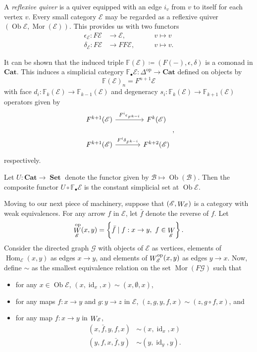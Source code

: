 \documentclass[10pt,letterpaper,cm]{nupset}
\theoremstyle{definition}
\theoremstyle{theorem}
\theoremstyle{remark}
\DeclareMathOperator{\ob}{Ob}
\DeclareMathOperator{\mor}{Mor}
\newcommand{\0}{\mathbf{0}}
\newcommand{\1}{\mathbf{1}}
\newcommand{\2}{\mathbf{2}}
\DeclareMathOperator{\op}{op}
\DeclareMathOperator{\set}{\mathbf{Set}}
\newcommand{\e}{\mathscr{E}}
\DeclareMathOperator{\Hom}{Hom}
\DeclareMathOperator{\idd}{id}
\DeclareMathOperator{\we}{\mathnormal{W}}
\newcommand{\bi}{\begin{itemize}}
\newcommand{\ei}{\end{itemize}}
\begin{document}
\smallskip

A \textit{reflexive quiver} is a quiver equipped with an edge $i_v$ from $v$ to itself for each vertex $v$. Every small category $\e$ may be regarded as a reflexive quiver $\left(\ob{\e}, \mor(\e)\right)$. This provides us with two functors
\begin{alignat*}
\epsilon_{\e} : F{\e} &\longrightarrow \e , &&\  \quad v \mapsto v
\\ \delta_{\e}: F{\e} &\longrightarrow F{F{\e}}, &&\  \quad v \mapsto v.
\end{alignat*} 

It can be shown that the induced  triple $\mathbb{F}(\e)\coloneqq \left(F({-}), \epsilon, \delta\right)$ is a comonad in $\mathbf{Cat}$. This induces a simplicial category $\mathbb{F}_{\bullet}{\e} : \varDelta^{\op} \to \mathbf{Cat}$ defined on objects by
\[
\mathbb{F}(\e)_n = F^{n+1}{\e}
\]
with face $d_i : \mathbb{F}_k(\e) \to  \mathbb{F}_{k-1}(\e)$ and degeneracy $s_i :  \mathbb{F}_k(\e) \to  \mathbb{F}_{k+1}(\e)$ operators given by
\[
\begin{tikzcd}[column sep=large]
F^{k+1}(\e) \arrow[r, "F^i\epsilon_{F^{k-i}}"] & F^k(\e)     \\
F^{k+1}(\e) \arrow[r, "F^i\delta_{F^{k-i}}"]   & F^{k+2}(\e)
\end{tikzcd}
,\]
respectively.

\medskip

Let $U: \mathbf{Cat} \to \set$ denote the functor given by  $\mathscr{B} \mapsto \ob(\mathscr{B})$. Then the composite functor $U \circ \mathbb{F}_{\bullet}{\e}$ is the constant simplicial set at $\ob{\e}$.

\medskip

Moving to our next piece of machinery, suppose that $\left(\e, \we_{\e}\right)$ is a category with weak equivalences. For any arrow $f$ in $\e$, let $\bar{f}$ denote the reverse of $f$. Let $$\we_{\e}^{\op}(x,y) = \left\{\bar{f} \mid f : x\to y, \ f \in \we_{\e}\right\}.$$ Consider the directed graph $\mathcal{G}$ with objects of $\e$ as vertices, elements of  $\Hom_{\e}(x,y)$ as edges $x \to y$, and elements of $\we_{\e}^{\op}(x,y)$ as edges $y\to x$. Now, define $\sim$ as the smallest equivalence relation on the set $\mor(F{\mathcal{G}})$ such that

\bi
\item for any $x\in \ob{\e}$, $\left(x,\idd_x, x\right) \sim \left(x, \emptyset, x\right)$,
\item for any maps $f: x\to y$ and $g: y \to z$ in $\e$, $\left(z,g,y,f,x\right)\sim \left(z,g\circ f,x\right)$, and 
\item for any map $f: x\to y$ in $\we_{\e}$, 
\begin{align*}
\left(x ,\bar{f} , y,  f, x\right) &\sim \left(x, \idd_x, x \right)
\\  \left(y ,f , x,  \bar{f}, y\right) &\sim \left(y, \idd_y, y \right).
\end{align*}
\ei
\end{document}
